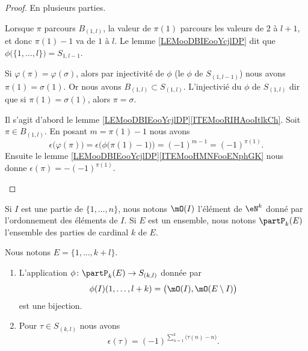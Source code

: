 \begin{proof}
	En plusieurs parties.
	\begin{subproof}
		\spitem[Surjectif]
		Lorsque \( \pi\) parcours \( B_{(1,l)}\), la valeur de \( \pi(1)\) parcours les valeurs de \( 2\) à \( l+1\), et donc \( \pi(1)-1\) va de \( 1\) à \( l\). Le lemme \ref{LEMooDBIEooYcjlDP} dit que \( \phi\big( \{ 1,\ldots,l \} \big)=S_{1,l-1}\).

		\spitem[Injectif]
		Si \( \varphi(\pi)=\varphi(\sigma)\), alors par injectivité de \( \phi\) (le \( \phi\) de \( S_{(1,l-1)}\)) nous avons \( \pi(1)=\sigma(1)\). Or nous avons \( B_{(1,l)}\subset S_{(1,l)}\). L'injectivié du \( \phi\) de \( S_{(1,l)} \) dir que si \( \pi(1)=\sigma(1)\), alors \( \pi=\sigma\).

		\spitem[Signature]
		Il s'agit d'abord le lemme \ref{LEMooDBIEooYcjlDP}\ref{ITEMooRIHAooItlkCh}. Soit \( \pi\in B_{(1,l)}\). En posant \( m=\pi(1)-1\) nous avons
		\begin{equation}
			\epsilon\big( \varphi(\pi) \big)=\epsilon\Big( \phi\big( \pi(1)-1 \big) \Big)=(-1)^{m-1}=(-1)^{\pi(1)}.
		\end{equation}
		Ensuite le lemme \ref{LEMooDBIEooYcjlDP}\ref{ITEMooHMNFooENphGK} nous donne \( \epsilon(\pi)=-(-1)^{\pi(1)}\).
	\end{subproof}
\end{proof}

\begin{normaltext}
	Si \( I\) est une partie de \( \{ 1,\ldots,n \}\), nous notons \( \mO(I)\) l'élément de \( \eN^k\) donné par l'ordonnement des éléments de \( I\). Si \( E\) est un ensemble, nous notons \( \partP_k(E)\) l'ensemble des parties de cardinal \( k\) de \( E\).
\end{normaltext}

\begin{lemma}		\label{LEMooKGETooKhomPn}
	Nous notons \( E=\{ 1,\ldots,k+l \}\).

	\begin{enumerate}
		\item

		      L'application \(\phi \colon \partP_k(E)\to S_{(k,l)}  \) donnée par
		      \begin{equation}
			      \phi(I)(1,\ldots,l+k)=\big( \mO(I),\mO(E\setminus I) \big)
		      \end{equation}
		      est une bijection.
		\item
		      Pour \( \tau\in S_{(k,l)}\) nous avons
		      \begin{equation}		\label{EQooPWREooEeHcBv}
			      \epsilon(\tau)=(-1)^{\sum_{n=1}^k\big( \tau(n)-n \big)}.
		      \end{equation}
	\end{enumerate}
\end{lemma}

